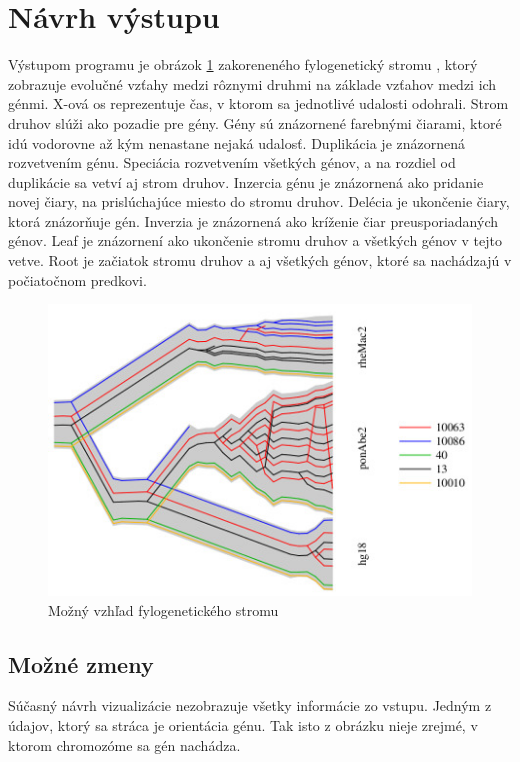 \section{Návrh výstupu}
Výstupom programu je obrázok \ref{obr:tree} zakoreneného fylogenetický stromu , ktorý zobrazuje evolučné vzťahy medzi rôznymi druhmi na základe vzťahov medzi ich génmi.
X-ová os reprezentuje čas, v ktorom sa jednotlivé udalosti odohrali.
\newline
Strom druhov slúži ako pozadie pre gény.
\newline
Gény sú znázornené farebnými čiarami, ktoré idú vodorovne až kým nenastane nejaká udalosť.
\newline
Duplikácia je znázornená rozvetvením génu. 
\newline
Speciácia rozvetvením všetkých génov, a na rozdiel od duplikácie sa vetví aj strom druhov.
\newline 
Inzercia génu je znázornená ako pridanie novej čiary, na prislúchajúce miesto do stromu druhov.
\newline
Delécia je ukončenie čiary, ktorá znázorňuje gén.
\newline 
Inverzia je znázornená ako kríženie čiar preusporiadaných génov.
\newline 
Leaf je znázornení ako ukončenie stromu druhov a všetkých génov v tejto vetve.
\newline
Root je začiatok stromu druhov a aj všetkých génov, ktoré sa nachádzajú v počiatočnom predkovi.
\begin{figure}
\centerline{\includegraphics[width=1\textwidth]{images/DUP-tube-tree}}
\caption{Možný vzhľad fylogenetického stromu \cite{Vinar2010}}\label{obr:tree}
\end{figure}
\subsection{Možné zmeny}
Súčasný návrh vizualizácie nezobrazuje všetky informácie zo vstupu. Jedným z údajov, ktorý sa stráca je orientácia génu. Tak isto z obrázku nieje zrejmé, v ktorom chromozóme sa gén nachádza.  